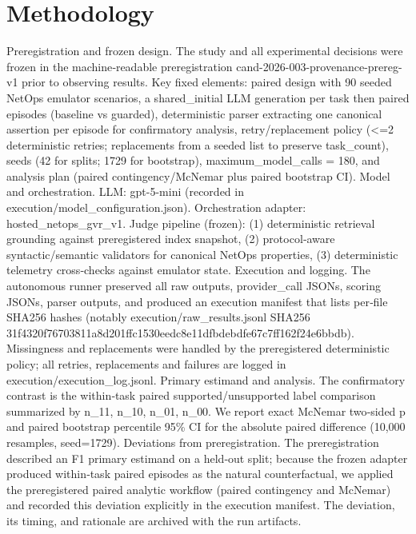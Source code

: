 \documentclass[conference]{IEEEtran}
\begin{document}
\section{Methodology}
Preregistration and frozen design. The study and all experimental decisions were frozen in the machine‑readable preregistration cand-2026-003-provenance-prereg-v1 prior to observing results. Key fixed elements: paired design with 90 seeded NetOps emulator scenarios, a shared\_initial LLM generation per task then paired episodes (baseline vs guarded), deterministic parser extracting one canonical assertion per episode for confirmatory analysis, retry/replacement policy (<=2 deterministic retries; replacements from a seeded list to preserve task\_count), seeds (42 for splits; 1729 for bootstrap), maximum\_model\_calls = 180, and analysis plan (paired contingency/McNemar plus paired bootstrap CI). Model and orchestration. LLM: gpt-5-mini (recorded in execution/model\_configuration.json). Orchestration adapter: hosted\_netops\_gvr\_v1. Judge pipeline (frozen): (1) deterministic retrieval grounding against preregistered index snapshot, (2) protocol‑aware syntactic/semantic validators for canonical NetOps properties, (3) deterministic telemetry cross‑checks against emulator state. Execution and logging. The autonomous runner preserved all raw outputs, provider\_call JSONs, scoring JSONs, parser outputs, and produced an execution manifest that lists per‑file SHA256 hashes (notably execution/raw\_results.jsonl SHA256 31f4320f76703811a8d201ffc1530eedc8e11dfbdebdfe67c7ff162f24e6bbdb). Missingness and replacements were handled by the preregistered deterministic policy; all retries, replacements and failures are logged in execution/execution\_log.jsonl. Primary estimand and analysis. The confirmatory contrast is the within‑task paired supported/unsupported label comparison summarized by n\_11, n\_10, n\_01, n\_00. We report exact McNemar two‑sided p and paired bootstrap percentile 95\% CI for the absolute paired difference (10,000 resamples, seed=1729). Deviations from preregistration. The preregistration described an F1 primary estimand on a held‑out split; because the frozen adapter produced within‑task paired episodes as the natural counterfactual, we applied the preregistered paired analytic workflow (paired contingency and McNemar) and recorded this deviation explicitly in the execution manifest. The deviation, its timing, and rationale are archived with the run artifacts.
\end{document}
